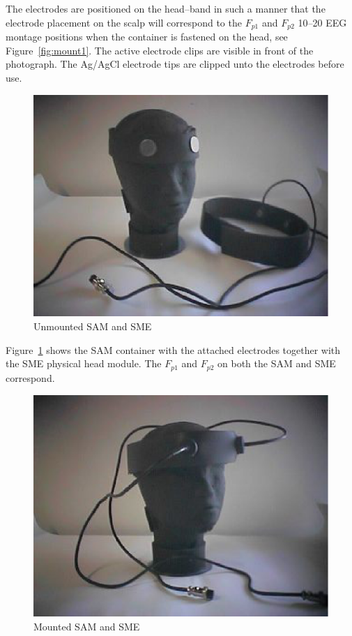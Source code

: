 The electrodes are positioned on the head--band in such a manner that
the electrode placement on the scalp will correspond to the $F_{p1}$
and $F_{p2}$ 10--20 EEG montage positions when the container is
fastened on the head, see Figure~\ref{fig:mount1}. The active
electrode clips are visible in front of the photograph. The Ag/AgCl
electrode tips are clipped unto the electrodes before use. 


\begin{figure}[htbp]
\begin{center}
	\includegraphics*{unmounted-SMEandSAM.ps}
	\caption{Unmounted SAM and SME}
	\label{fig:unSMEandSAM}
\end{center}
\end{figure}

Figure~\ref{fig:unSMEandSAM} shows the SAM container with the attached
electrodes together with the SME physical head module. The $F_{p1}$
and $F_{p2}$ on both the SAM and SME correspond.

\begin{figure}[htbp]
\begin{center}
	\includegraphics*{mounted-SMEanSAM.ps}
	\caption{Mounted SAM and SME}
	\label{fig:SMEandSAM}
\end{center}
\end{figure}

